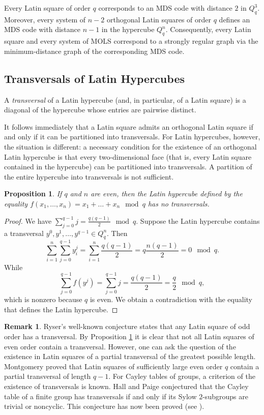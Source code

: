 \documentclass[11pt]{article}
\newtheorem{claim}{Proposition}[section]
\theoremstyle{definition}
\newtheorem{remark}{Remark}[section]
\begin{document}
{{{Every Latin square of order $q$ corresponds to an MDS code with
distance $2$ in $Q^3_q$. Moreover, every system of $n-2$
orthogonal Latin squares of order $q$
 defines an {\rm MDS} code with distance $n-1$ in the hypercube $Q^n_q$.
 Consequently, every Latin square and every system of MOLS correspond to a strongly regular graph via the minimum-distance graph of the corresponding MDS code. 



\subsection{Transversals of Latin Hypercubes}


A {\sl transversal} of a Latin hypercube (and, in particular, of a
Latin square) is a diagonal of the hypercube whose entries are pairwise
distinct.

It follows immediately that a Latin square admits an orthogonal Latin
square if and only if it can be partitioned into transversals.
For Latin hypercubes, however, the situation is different: a necessary
condition for the existence of an orthogonal Latin hypercube is that
every two-dimensional face (that is, every Latin square contained in
the hypercube) can be partitioned into transversals. A partition of the
entire hypercube into transversals is not sufficient.






\begin{claim}\label{transver}
If $q$ and $n$ are even, then the Latin hypercube defined by
the equality $f(x_1,\dots,x_n)=x_1+\dots+x_n \mod q$ has no
transversals.
\end{claim}
\begin{proof}
We have $\sum\limits_{j=0}^{q-1}j= \frac{q(q-1)}{2}\mod q$. Suppose the
Latin hypercube contains a transversal $y^0,y^1,\dots,y^{q-1}\in
Q^n_q$. Then $$\sum_{i=1}^{n}\sum_{j=0}^{q-1} y^j_i =
\sum_{i=1}^{n} \frac{q(q-1)}{2} = q\frac{n(q-1)}{2}=0\mod q.$$ While
$$\sum_{j=0}^{q-1} f(y^j) = \sum_{j=0}^{q-1}j= \frac{q(q-1)}{2}=\frac{q}{2}\mod
q,$$ which is nonzero because $q$ is even. We obtain a contradiction with the equality that defines the
Latin hypercube.
\end{proof}

\begin{remark} Ryser's well-known conjecture states that any Latin square of
odd order has a transversal. By
Proposition \ref{transver} it is clear that not all Latin squares of
even order contain a transversal. However, one can ask the question
of the existence in Latin squares of a partial transversal of the greatest
possible length. Montgomery \cite{Mont} proved that Latin
squares of sufficiently large even order $q$ contain a partial
transversal of length $q-1$. For Cayley  tables of groups, a criterion  of the existence  of transversals is known.  Hall and Paige conjectured that the  Cayley table of a finite group  has transversals if and only if  its Sylow $2$-subgroups are trivial or noncyclic. This conjecture has now been  proved (see \cite{Bray}).


\end{remark}}}}
\end{document}

